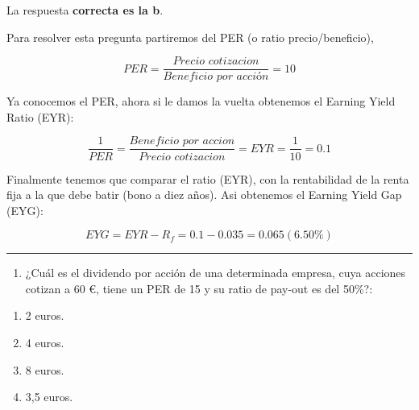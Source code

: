 \documentclass[
  letterpaper,
  DIV=11,
  numbers=noendperiod]{scrreprt}
\providecommand{\tightlist}{%
  \setlength{\itemsep}{0pt}\setlength{\parskip}{0pt}}\usepackage{longtable,booktabs,array}
\begin{document}
\begin{tcolorbox}[enhanced jigsaw, left=2mm, opacityback=0, colback=white, breakable, arc=.35mm, bottomrule=.15mm, rightrule=.15mm, toprule=.15mm, leftrule=.75mm, colframe=quarto-callout-tip-color-frame]
\begin{minipage}[t]{5.5mm}
\textcolor{quarto-callout-tip-color}{\faLightbulb}
\end{minipage}%
\begin{minipage}[t]{\textwidth - 5.5mm}

La respuesta \textbf{correcta es la b}.

Para resolver esta pregunta partiremos del PER (o ratio
precio/beneficio),

\[PER =\frac { Precio\, \, cotizacion}{ Beneficio\, \, por\, \, acción  }= 10\]

Ya conocemos el PER, ahora si le damos la vuelta obtenemos el Earning
Yield Ratio (EYR):

\[\frac { 1 }{ PER } =\frac { Beneficio\, \, por\, \, accion }{ Precio\, \, cotizacion }=EYR=\frac { 1}{ 10}=0.1\]

Finalmente tenemos que comparar el ratio (EYR), con la rentabilidad de
la renta fija a la que debe batir (bono a diez años). Asi obtenemos el
Earning Yield Gap (EYG):

\[EYG = EYR - R _f=0.1-0.035=0.065(6.50\%)\]

\end{minipage}%
\end{tcolorbox}

\begin{center}\rule{0.5\linewidth}{0.5pt}\end{center}

\begin{enumerate}
\def\labelenumi{\arabic{enumi}.}
\setcounter{enumi}{86}
\tightlist
\item
  ¿Cuál es el dividendo por acción de una determinada empresa, cuya
  acciones cotizan a 60 €, tiene un PER de 15 y su ratio de pay-out es
  del 50\%?:
\end{enumerate}

\begin{enumerate}
\def\labelenumi{\alph{enumi})}
\item
  2 euros.
\item
  4 euros.
\item
  8 euros.
\item
  3,5 euros.
\end{enumerate}
\end{document}
